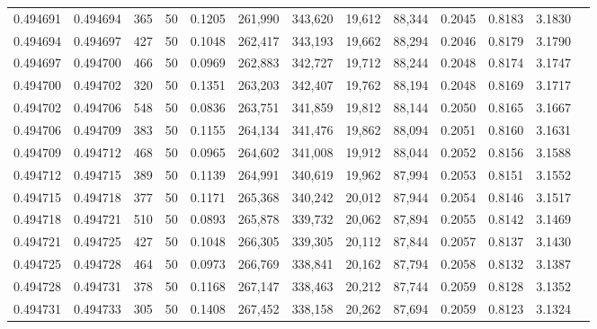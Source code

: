 \begin{tabular}{rrrrrrrrrrrrr}
0.494691 & 0.494694 &   365 &  50 &                                     0.1205 & 261,990 & 343,620 &  19,612 &  88,344 & 0.2045 & 0.8183 & 3.1830 \\
0.494694 & 0.494697 &   427 &  50 &                                     0.1048 & 262,417 & 343,193 &  19,662 &  88,294 & 0.2046 & 0.8179 & 3.1790 \\
0.494697 & 0.494700 &   466 &  50 &                                     0.0969 & 262,883 & 342,727 &  19,712 &  88,244 & 0.2048 & 0.8174 & 3.1747 \\
0.494700 & 0.494702 &   320 &  50 &                                     0.1351 & 263,203 & 342,407 &  19,762 &  88,194 & 0.2048 & 0.8169 & 3.1717 \\
0.494702 & 0.494706 &   548 &  50 &                                     0.0836 & 263,751 & 341,859 &  19,812 &  88,144 & 0.2050 & 0.8165 & 3.1667 \\
0.494706 & 0.494709 &   383 &  50 &                                     0.1155 & 264,134 & 341,476 &  19,862 &  88,094 & 0.2051 & 0.8160 & 3.1631 \\
0.494709 & 0.494712 &   468 &  50 &                                     0.0965 & 264,602 & 341,008 &  19,912 &  88,044 & 0.2052 & 0.8156 & 3.1588 \\
0.494712 & 0.494715 &   389 &  50 &                                     0.1139 & 264,991 & 340,619 &  19,962 &  87,994 & 0.2053 & 0.8151 & 3.1552 \\
0.494715 & 0.494718 &   377 &  50 &                                     0.1171 & 265,368 & 340,242 &  20,012 &  87,944 & 0.2054 & 0.8146 & 3.1517 \\
0.494718 & 0.494721 &   510 &  50 &                                     0.0893 & 265,878 & 339,732 &  20,062 &  87,894 & 0.2055 & 0.8142 & 3.1469 \\
0.494721 & 0.494725 &   427 &  50 &                                     0.1048 & 266,305 & 339,305 &  20,112 &  87,844 & 0.2057 & 0.8137 & 3.1430 \\
0.494725 & 0.494728 &   464 &  50 &                                     0.0973 & 266,769 & 338,841 &  20,162 &  87,794 & 0.2058 & 0.8132 & 3.1387 \\
0.494728 & 0.494731 &   378 &  50 &                                     0.1168 & 267,147 & 338,463 &  20,212 &  87,744 & 0.2059 & 0.8128 & 3.1352 \\
0.494731 & 0.494733 &   305 &  50 &                                     0.1408 & 267,452 & 338,158 &  20,262 &  87,694 & 0.2059 & 0.8123 & 3.1324 \\

\end{tabular}
